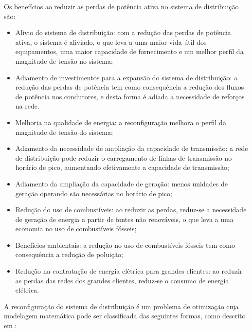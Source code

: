 Os benefícios ao reduzir as perdas de potência ativa no sistema de distribuição são:%
\begin{itemize}
    \item Alívio do sistema de distribuição: com a redução das perdas de potência ativa, o sistema é aliviado, o que leva a uma maior vida útil dos equipamentos, uma maior capacidade de fornecimento e um melhor perfil da magnitude de tensão no sistema;
    \item Adiamento de investimentos para a expansão do sistema de distribuição: a redução das perdas de potência tem como consequência a redução dos fluxos de potência nos condutores, e desta forma é adiada a necessidade de reforços na rede.
    
    \item Melhoria na qualidade de energia: a reconfiguração melhora o perfil da magnitude de tensão do sistema;
    
    \item Adiamento da necessidade de ampliação da capacidade de transmissão: a rede de distribuição pode reduzir o carregamento de linhas de transmissão no horário de pico, aumentando efetivamente a capacidade de transmissão;
    
    \item Adiamento da ampliação da capacidade de geração: menos unidades de geração operando são necessárias no horário de pico;
    
    \item Redução do uso de combustíveis: ao reduzir as perdas, reduz-se a necessidade de geração de energia a partir de fontes não renováveis, o que leva a uma economia no uso de combustíveis fósseis;
    
    \item Benefícios ambientais: a redução no uso de combustíveis fósseis tem como consequência a redução de poluição;
    
    \item Redução na contratação de energia elétrica para grandes clientes: ao reduzir as perdas das redes dos grandes clientes, reduz-se o consumo de energia elétrica.
\end{itemize}

A reconfiguração do sistema de distribuição é um problema de otimização cuja modelagem matemática pode ser classificada das seguintes formas, como descrito em \cite{Goncalves2013ModelosRadiais}:

